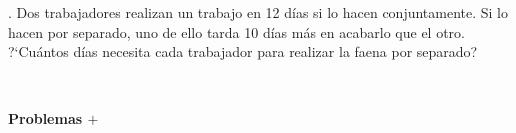 \begin{mipropuesto}
. Dos trabajadores realizan un trabajo en 12 días si lo hacen conjuntamente. Si lo hacen por separado, uno de ello tarda 10 días más en acabarlo que el otro. ?`Cuántos días necesita cada trabajador para realizar la faena por separado?
\end{mipropuesto}
\vspace{-8mm}
\begin{flushright}
	\begin{footnotesize} \textcolor{gris}{}	\end{footnotesize}
\end{flushright}





\newpage

$\qquad$


\begin{adjustwidth}{50pt}{250pt}
\begin{cuadro-naranja}
\textbf{\huge{Problemas $\boldsymbol{+}$}}\normalsize{$\, $}
\end{cuadro-naranja}	
\end{adjustwidth}



